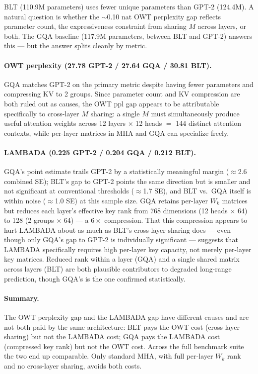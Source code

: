 \documentclass[11pt]{article}
\begin{document}
BLT (110.9M parameters) uses fewer unique parameters than GPT-2 (124.4M). A natural question is whether the $\sim$0.10 nat OWT perplexity gap reflects parameter count, the expressiveness constraint from sharing $M$ across layers, or both. The GQA baseline (117.9M parameters, between BLT and GPT-2) answers this --- but the answer splits cleanly by metric.

\paragraph{OWT perplexity (27.78 GPT-2 / 27.64 GQA / 30.81 BLT).} GQA matches GPT-2 on the primary metric despite having fewer parameters and compressing KV to 2 groups. Since parameter count and KV compression are both ruled out as causes, the OWT ppl gap appears to be attributable specifically to cross-layer $M$ sharing: a single $M$ must simultaneously produce useful attention weights across 12 layers $\times$ 12 heads $=$ 144 distinct attention contexts, while per-layer matrices in MHA and GQA can specialize freely.

\paragraph{LAMBADA (0.225 GPT-2 / 0.204 GQA / 0.212 BLT).} GQA's point estimate trails GPT-2 by a statistically meaningful margin ($\approx$2.6 combined SE); BLT's gap to GPT-2 points the same direction but is smaller and not significant at conventional thresholds ($\approx$1.7 SE), and BLT vs.\ GQA itself is within noise ($\approx$1.0 SE) at this sample size. GQA retains per-layer $W_k$ matrices but reduces each layer's effective key rank from 768 dimensions (12 heads $\times$ 64) to 128 (2 groups $\times$ 64) --- a $6\times$ compression. That this compression appears to hurt LAMBADA about as much as BLT's cross-layer sharing does --- even though only GQA's gap to GPT-2 is individually significant --- suggests that LAMBADA specifically requires high per-layer key capacity, not merely per-layer key matrices. Reduced rank within a layer (GQA) and a single shared matrix across layers (BLT) are both plausible contributors to degraded long-range prediction, though GQA's is the one confirmed statistically.

\paragraph{Summary.} The OWT perplexity gap and the LAMBADA gap have different causes and are not both paid by the same architecture: BLT pays the OWT cost (cross-layer sharing) but not the LAMBADA cost; GQA pays the LAMBADA cost (compressed key rank) but not the OWT cost. Across the full benchmark suite the two end up comparable. Only standard MHA, with full per-layer $W_k$ rank and no cross-layer sharing, avoids both costs.
\end{document}
